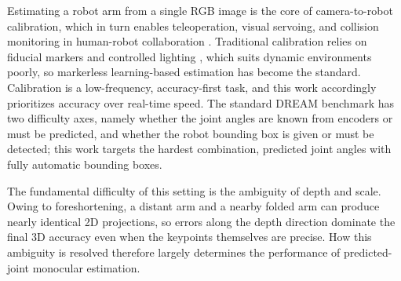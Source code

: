 Estimating a robot arm from a single RGB image is the core of camera-to-robot calibration, which in turn enables teleoperation, visual servoing, and collision monitoring in human-robot collaboration \cite{wang2024multimodal,othman2022overview}. Traditional calibration relies on fiducial markers and controlled lighting \cite{garrido2014automatic,fiala2005artag,olson2011apriltag}, which suits dynamic environments poorly, so markerless learning-based estimation has become the standard. Calibration is a low-frequency, accuracy-first task, and this work accordingly prioritizes accuracy over real-time speed. The standard DREAM benchmark has two difficulty axes, namely whether the joint angles are known from encoders or must be predicted, and whether the robot bounding box is given or must be detected; this work targets the hardest combination, predicted joint angles with fully automatic bounding boxes.

The fundamental difficulty of this setting is the ambiguity of depth and scale. Owing to foreshortening, a distant arm and a nearby folded arm can produce nearly identical 2D projections, so errors along the depth direction dominate the final 3D accuracy even when the keypoints themselves are precise. How this ambiguity is resolved therefore largely determines the performance of predicted-joint monocular estimation.

